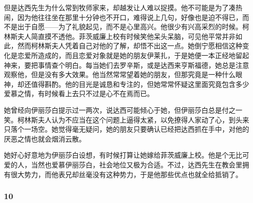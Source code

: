 \par 但是达西先生为什么常到牧师家来，却越发让人难以捉摸。他不可能是为了凑热闹，因为他往往坐在那里十分钟也不开口，难得说上几句，好像也是迫不得已，而不是出于自愿——为了礼貌起见，而不是心里高兴。他很少有兴高采烈的时候。柯林斯夫人简直摸不透他。菲茨威廉上校有时候笑他呆头呆脑，可见他平常并非如此，然而柯林斯夫人凭着自己对他的了解，却悟不出这一点。她倒宁愿相信这种变化是恋爱所造成的，而且恋爱对象就是她的朋友伊莱扎，于是她便一本正经地留起神来，要把事情查个明白。每当她们去罗辛斯，或是达西来亨斯福德，她总是注意观察他，但是没有多大效果。他当然常常望着她的朋友，但那究竟是一种什么眼神，却还值得斟酌。他的目光是诚恳和专注的，但她常常怀疑这里面究竟包含多少爱慕之情，有时候看上去只不过是心不在焉而已。
\par 她曾经向伊丽莎白提示过一两次，说达西可能倾心于她，但伊丽莎白总是付之一笑。柯林斯夫人认为不应当在这个问题上逼得太紧，以免撩得人家动了心，到头来只落个一场空。她觉得毫无疑问，她的朋友只要确认已经把达西抓在手中，对他的厌恶之情也就会烟消云散。
\par 她好心好意地为伊丽莎白设想，有时候打算让她嫁给菲茨威廉上校。他是个无比可爱的人，当然也爱慕伊丽莎白，社会地位又极为合适。不过，达西先生在教会里拥有很大势力，而他表兄却丝毫没有这种势力，于是他那些优点也就全给抵销了。



\subsubsection*{10}



